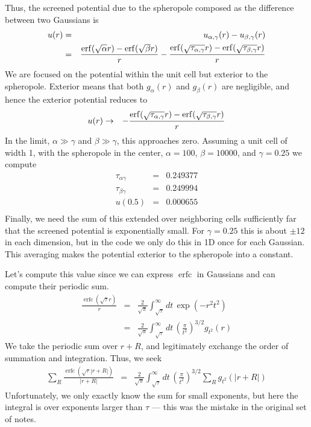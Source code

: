 \documentclass[12pt]{article}
\DeclareMathOperator{\erfc}{erfc}
\begin{document}
Thus, the screened potential due to the spheropole composed as the difference between two Gaussians is
\begin{eqnarray}
  u(r) & = & u_{\alpha,\gamma}(r) - u_{\beta,\gamma}(r) \\
       & = & \frac{\erf(\sqrt{\alpha}r)-\erf(\sqrt{\beta}r)}{r} - \frac{\erf(\sqrt{\tau_{\alpha,\gamma}}r)-\erf(\sqrt{\tau_{\beta,\gamma}}r)}{r}
\end{eqnarray}
We are focused on the potential within the unit cell but exterior to the spheropole.  Exterior means that both $g_\alpha(r)$ and $g_\beta(r)$ are negligible, and hence the exterior potential reduces to
\begin{eqnarray}
  u(r) & \rightarrow & - \frac{\erf(\sqrt{\tau_{\alpha,\gamma}}r)-\erf(\sqrt{\tau_{\beta,\gamma}}r)}{r}
\end{eqnarray}
In the limit, $\alpha \gg \gamma$ and $\beta \gg \gamma$, this approaches zero.  Assuming a unit cell of width 1, with the spheropole in the center, $\alpha=100$, $\beta=10000$, and $\gamma=0.25$ we compute 
\begin{eqnarray}
  \tau_{\alpha \gamma} & = & 0.249377 \\
  \tau_{\beta \gamma} & = & 0.249994 \\
  u(0.5) & = & 0.000655 \\
\end{eqnarray}
Finally, we need the sum of this extended over neighboring cells sufficiently far that the screened potential is exponentially small.  For $\gamma=0.25$ this is about $\pm12$ in each dimension, but in the code we only do this in 1D once for each Gaussian.  This averaging makes the potential exterior to the spheropole into a constant.

Let's compute this value since we can express $\erfc$ in Gaussians and can compute their periodic sum. 
\begin{eqnarray}
  \frac{\erfc(\sqrt{\tau}r)}{r} & = & \frac{2}{\sqrt{\pi}} \int_{\sqrt{\tau}}^\infty \! dt \,\exp(-r^2 t^2) \\
 & = & \frac{2}{\sqrt{\pi}} \int_{\sqrt{\tau}}^\infty \! dt \, \left( \frac{\pi}{t^2} \right)^{3/2}  g_{t^2}(r)
\end{eqnarray}
We take the periodic sum over $r+R$, and legitimately exchange the order of summation and integration.  Thus, we seek
\begin{eqnarray}
  \sum_R \frac{\erfc(\sqrt{\tau}|r+R|)}{|r+R|}  & = & \frac{2}{\sqrt{\pi}} \int_{\sqrt{\tau}}^\infty \! dt \, \left( \frac{\pi}{t^2} \right)^{3/2}  \sum_R g_{t^2}(|r+R|)
\end{eqnarray}
Unfortunately, we only exactly know the sum for small exponents, but here the integral is over exponents larger than $\tau$ --- this was the mistake in the original set of notes.
\end{document}
